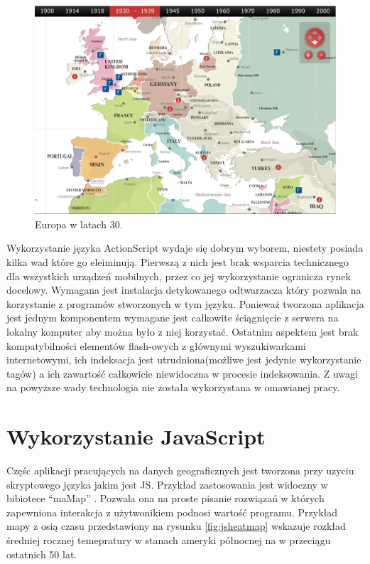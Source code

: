 \begin{figure}[H]
  \centering
    \includegraphics[width=130mm]{ge/archives.jpg}
  \caption{Europa w latach 30.}
  \label{fig:flasheurope}
\end{figure}


Wykorzystanie języka ActionScript wydaje się dobrym wyborem, niestety posiada kilka wad które go eleiminują. Pierwszą z nich jest brak wsparcia technicznego dla wszystkich urządzeń mobilnych, przez co jej wykorzystanie ogranicza rynek docelowy.
Wymagana jest instalacja detykowanego odtwarzacza który pozwala na korzystanie z programów stworzonych w tym języku.
Ponieważ tworzona aplikacja jest jednym komponentem wymagane jest całkowite ściągnięcie z serwera na lokalny komputer aby można było z niej korzystać. Ostatnim aspektem jest brak kompatybilności elementów flash-owych z głównymi wyszukiwarkami internetowymi, ich indeksacja jest utrudniona(możliwe jest jedynie wykorzystanie tagów) a ich zawartość całkowicie niewidoczna w procesie indeksowania. Z uwagi na powyższe wady technologia nie została wykorzystana w omawianej pracy.

\section{Wykorzystanie JavaScript}
\label{sec:pref}

Częśc aplikacji pracujących na danych geograficznych jest tworzona przy uzyciu skryptowego języka jakim jest JS. Przykład zastosowania jest widoczny w bibiotece ``maMap'' \cite{jsmapapp}. Pozwala ona na proste pisanie rozwiązań w których zapewniona interakcja z użytwonikiem podnosi wartość programu. Przykład mapy z osią czasu przedstawiony na rysunku \ref{fig:jsheatmap} wskazuje rozkład średniej rocznej temepratury w stanach ameryki północnej na w przeciągu ostatnich 50 lat.

